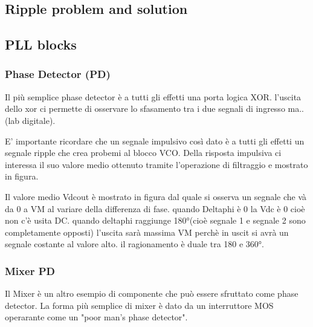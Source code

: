 \subsection{Ripple problem and solution}
\subsection{PLL blocks}
\subsubsection{Phase Detector (PD)}
Il più semplice phase detector è a tutti gli effetti una porta logica XOR.
l'uscita dello xor ci permette di osservare lo sfasamento tra i due segnali di ingresso ma..(lab digitale).

E' importante ricordare che un segnale impulsivo così dato è a tutti gli effetti un segnale ripple che crea probemi al blocco VCO. Della risposta impulsiva ci interessa il suo valore medio ottenuto tramite l'operazione di filtraggio e mostrato in figura.

Il valore medio Vdcout è mostrato in figura dal quale si osserva un segnale che và da 0 a VM al variare della differenza di fase.
quando Deltaphi è 0 la Vdc è 0 cioè non c'è usita DC.
quando deltaphi raggiunge 180°(cioè segnale 1 e segnale 2 sono completamente opposti) l'uscita sarà massima VM perchè in uscit si avrà un segnale costante al valore alto.
il ragionamento è duale tra 180 e 360°.

\subsubsection{Mixer PD }
Il Mixer è un altro esempio di componente che può essere sfruttato come phase detector.
La forma più semplice di mixer è dato da un interruttore MOS operarante come un "poor man's phase detector".


